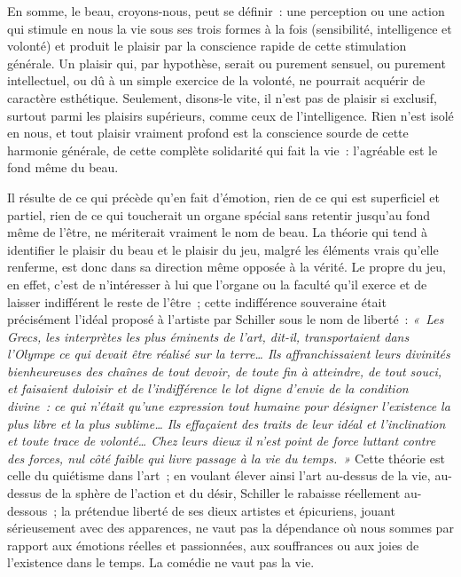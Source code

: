 \documentclass[french,twoside]{book} %
\begin{document}
 En somme, le beau, croyons-nous, peut se définir : une perception ou une action qui stimule en nous la vie sous ses trois formes à la fois (sensibilité, intelligence et volonté) et produit le plaisir par la conscience rapide de cette stimulation générale. Un plaisir qui, par hypothèse, serait ou purement sensuel, ou purement intellectuel, ou dû à un simple exercice de la volonté, ne pourrait acquérir de caractère esthétique. Seulement, disons-le vite, il n’est pas de plaisir si exclusif, surtout parmi les plaisirs supérieurs, comme ceux de l’intelligence. Rien n’est isolé en nous, et tout plaisir vraiment profond est la conscience sourde de cette harmonie générale, de cette complète solidarité qui fait la vie : l’agréable est le fond même du beau.\par
Il résulte de ce qui précède qu’en fait d’émotion, rien de ce qui est superficiel et partiel, rien de ce qui toucherait un organe spécial sans retentir jusqu’au fond même de l’être, ne mériterait vraiment le nom de beau. La théorie qui tend à identifier le plaisir du beau et le plaisir du jeu, malgré les éléments vrais qu’elle renferme, est donc dans sa direction même opposée à la vérité. Le propre du jeu, en effet, c’est de n’intéresser à lui que l’organe ou la faculté  qu’il exerce et de laisser indifférent le reste de l’être ; cette indifférence souveraine était précisément l’idéal proposé à l’artiste par Schiller sous le nom de liberté : \emph{« Les Grecs, les interprètes les plus éminents de l’art, dit-il, transportaient dans l’Olympe ce qui devait être réalisé sur la terre… Ils affranchissaient leurs divinités bienheureuses des chaînes de tout devoir, de toute fin à atteindre, de tout souci, et faisaient du\emph{loisir} et de l’\emph{indifférence} le lot digne d’envie de la condition divine : ce qui n’était qu’une expression tout humaine pour désigner l’existence la plus libre et la plus sublime… Ils effaçaient des traits de leur idéal et l’\emph{inclination} et toute trace de \emph{volonté}… Chez leurs dieux il n’est point de force luttant contre des forces, nul côté faible qui livre passage à la vie du temps. »} Cette théorie est celle du quiétisme dans l’art ; en voulant élever ainsi l’art au-dessus de la vie, au-dessus de la sphère de l’action et du désir, Schiller le rabaisse réellement au-dessous ; la prétendue liberté de ses dieux artistes et épicuriens, jouant sérieusement avec des apparences, ne vaut pas la dépendance où nous sommes par rapport aux émotions réelles et passionnées, aux souffrances ou aux joies de l’existence dans le temps. La comédie ne vaut pas la vie.\par
\end{document}
